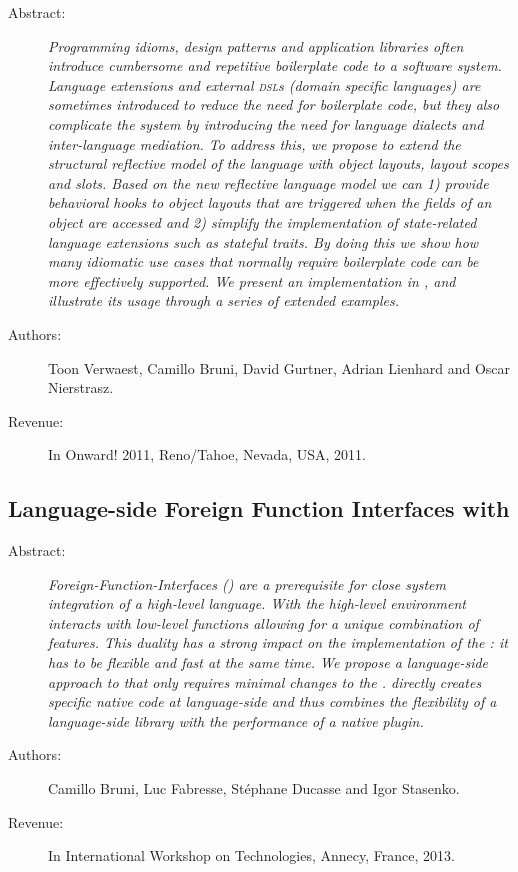 \begin{description}
	\item[Abstract:] \emph{
Programming idioms, design patterns and application libraries often introduce cumbersome and repetitive boilerplate code to a software system.
Language extensions and external \textsc{dsl}s (domain specific languages) are sometimes introduced to reduce the need for boilerplate code, but they also complicate the system by introducing the need for language dialects and inter-language mediation.
To address this, we propose to extend the structural reflective model of the language with object layouts, layout scopes and slots.
Based on the new reflective language model we can 1) provide behavioral hooks to object layouts that are triggered when the fields of an object are accessed and 2) simplify the implementation of state-related language extensions such as stateful traits.
By doing this we show how many idiomatic use cases that normally require boilerplate code can be more effectively supported.
We present an implementation in \ST, and illustrate its usage through a series of extended examples.}

	\item[Authors:] Toon Verwaest, Camillo Bruni, David Gurtner, Adrian Lienhard and Oscar Nierstrasz. 
	\item[Revenue:] In Onward! 2011, Reno/Tahoe, Nevada, USA, 2011.
\end{description}

\subsection{Language-side Foreign Function Interfaces with \NB}
\begin{description}
	\item[Abstract:] \emph{
		Foreign-Function-Interfaces (\FFIs) are a prerequisite for close system integration of a high-level language.
		With \FFIs the high-level environment interacts with low-level functions allowing for a unique combination of features.
		This duality has a strong impact on the implementation of the \FFI: it has to be flexible and fast at the same time.
		We propose \NB a language-side approach to \FFIs that only requires minimal changes to the \VM.
		\NB directly creates specific native code at language-side and thus combines the flexibility of a language-side library with the performance of a native plugin.}

	\item[Authors:] Camillo Bruni, Luc Fabresse, Stéphane Ducasse and Igor Stasenko. 
	\item[Revenue:] In International Workshop on \ST Technologies, Annecy, France, 2013.
\end{description}



